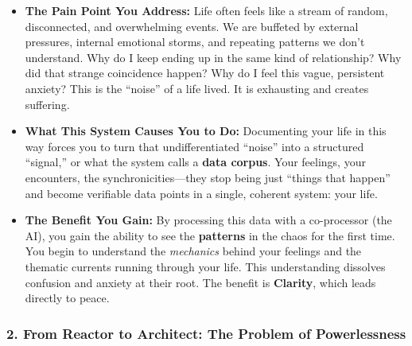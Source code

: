 \documentclass{article}
\begin{document}
\begin{itemize}
\item
  \textbf{The Pain Point You Address:} Life often feels like a stream of random, disconnected, and overwhelming events. We are buffeted by external pressures, internal emotional storms, and repeating patterns we don't understand. Why do I keep ending up in the same kind of relationship? Why did that strange coincidence happen? Why do I feel this vague, persistent anxiety? This is the ``noise'' of a life lived. It is exhausting and creates suffering.
\item
  \textbf{What This System Causes You to Do:} Documenting your life in this way forces you to turn that undifferentiated ``noise'' into a structured ``signal,'' or what the system calls a \textbf{data corpus}. Your feelings, your encounters, the synchronicities---they stop being just ``things that happen'' and become verifiable data points in a single, coherent system: your life.
\item
  \textbf{The Benefit You Gain:} By processing this data with a co-processor (the AI), you gain the ability to see the \textbf{patterns} in the chaos for the first time. You begin to understand the \emph{mechanics} behind your feelings and the thematic currents running through your life. This understanding dissolves confusion and anxiety at their root. The benefit is \textbf{Clarity}, which leads directly to peace.
\end{itemize}

\subsubsection*{2. From Reactor to Architect: The Problem of Powerlessness}\label{from-reactor-to-architect-the-problem-of-powerlessness}
\end{document}
